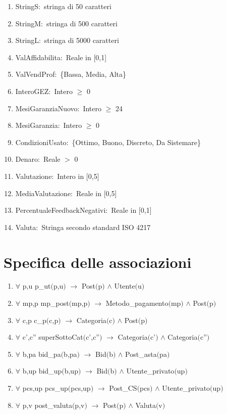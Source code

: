 \documentclass{article}
\begin{document}
\begin{enumerate}
    \item\label{sec:TipoStringS}StringS$: $ stringa di 50 caratteri
    \item\label{sec:TipoStringM}StringM$: $ stringa di 500 caratteri
    \item\label{sec:TipoStringL}StringL$: $ stringa di 5000 caratteri
    \item\label{sec:TipoValAffidabilita}ValAffidabilita$: $ Reale in [0,1]
    \item\label{sec:TipoValVendProf}ValVendProf$: $ \{Bassa, Media, Alta\}
    \item\label{sec:TipoInteroGEZ}InteroGEZ$: $ Intero $\geq$ 0
    \item\label{sec:TipoMesiGaranziaNuovo}MesiGaranziaNuovo$: $ Intero $\geq$ 24
    \item\label{sec:TipoMesiGaranzia}MesiGaranzia$: $ Intero $\geq$ 0
    \item\label{sec:TipoCondizioniUsato}CondizioniUsato$: $ \{Ottimo, Buono, Discreto, Da Sistemare\}
    \item\label{sec:TipoDenaro}Denaro$: $ Reale $>$ 0
    \item\label{sec:TipoValutazione}Valutazione$: $ Intero in [0,5]
    \item\label{sec:TipoMediaValutazione}MediaValutazione$: $ Reale in [0,5]
    \item\label{sec:TipoPercentualeFeedbackNegativi}PercentualeFeedbackNegativi$: $ Reale in [0,1]
    \item\label{sec:TipoValuta}Valuta$: $ Stringa secondo standard ISO 4217
\end{enumerate}

\newpage
\section{\label{sec:SpecificaAssociazioni}Specifica delle associazioni}
\begin{enumerate}
    \item $\forall$ p,u p\_ut$($p,u$)$ $\rightarrow$ Post$($p$)$ $\land$ Utente$($u$)$
    \item $\forall$ mp,p mp\_post$($mp,p$)$ $\rightarrow$ Metodo\_pagamento$($mp$)$ $\land$ Post$($p$)$
    \item $\forall$ c,p c\_p$($c,p$)$ $\rightarrow$ Categoria$($c$)$ $\land$ Post$($p$)$
    \item $\forall$ c',c'' superSottoCat$($c',c''$)$ $\rightarrow$ Categoria$($c'$)$ $\land$ Categoria$($c''$)$
    \item $\forall$ b,pa bid\_pa$($b,pa$)$ $\rightarrow$ Bid$($b$)$ $\land$ Post\_asta$($pa$)$
    \item $\forall$ b,up bid\_up$($b,up$)$ $\rightarrow$ Bid$($b$)$ $\land$ Utente\_privato$($up$)$
    \item $\forall$ pcs,up pcs\_up$($pcs,up$)$ $\rightarrow$ Post\_CS$($pcs$)$ $\land$ Utente\_privato$($up$)$
    \item $\forall$ p,v post\_valuta$($p,v$)$ $\rightarrow$ Post$($p$)$ $\land$ Valuta$($v$)$
\end{enumerate}
\end{document}
